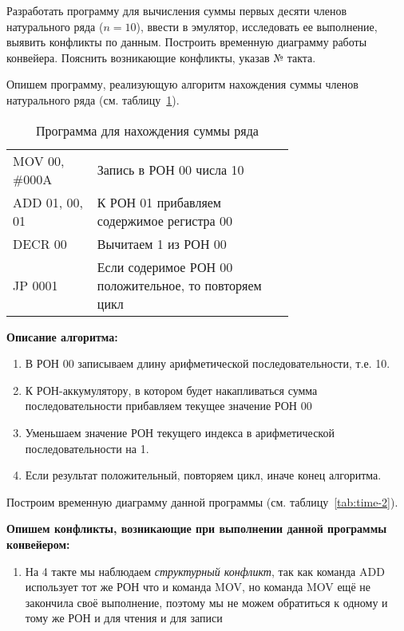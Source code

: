 \documentclass[a4paper,14pt]{extarticle}
\begin{document}
\begin{problem*}
	Разработать программу для вычисления суммы первых десяти членов натурального ряда ($n=10$),
	ввести в эмулятор, исследовать ее выполнение, выявить конфликты по
	данным. Построить временную диаграмму работы конвейера. Пояснить
	возникающие конфликты, указав № такта.

	\nonum Опишем программу, реализующую алгоритм нахождения суммы членов натурального ряда (см. таблицу~\ref{tab:prog-2}).
		\begin{table}[htbp]

		\begin{tabular}{|l|p{0.7\linewidth}|}
			\hline
			\centerboldcell{Команда} & \centerboldcell{Описание} \\ \hline\hline
			MOV 00, \#000A & Запись в РОН 00 числа 10 \\ \hline
			ADD 01, 00, 01 & К РОН 01 прибавляем содержимое регистра 00 \\ \hline
			DECR 00 & Вычитаем 1 из РОН 00 \\ \hline
			JP 0001 & Если содеримое РОН 00 положительное, то повторяем цикл \\ \hline
		\end{tabular}
		\caption{Программа для нахождения суммы ряда}
		\label{tab:prog-2}
	\end{table}


\textbf{Описание алгоритма:}
\begin{enumerate}
	\item В РОН 00 записываем длину арифметической последовательности, т.е. 10.
	\item К РОН-аккумулятору, в котором будет накапливаться сумма последовательности прибавляем текущее значение РОН 00
	\item Уменьшаем значение РОН текущего индекса в арифметической последовательности на 1.
	\item Если результат положительный, повторяем цикл, иначе конец алгоритма.
\end{enumerate}

Построим временную диаграмму данной программы (см. таблицу~\ref{tab:time-2}).

\textbf{Опишем конфликты, возникающие при выполнении данной программы конвейером:}
\begin{enumerate}
	\item На 4 такте мы наблюдаем \textit{структурный конфликт}, так как команда ADD использует тот же РОН что и команда MOV, но команда MOV ещё не закончила своё выполнение, поэтому мы  не можем обратиться к одному и тому же РОН и для чтения и для записи
	


\end{enumerate}
\end{problem*}
\end{document}
